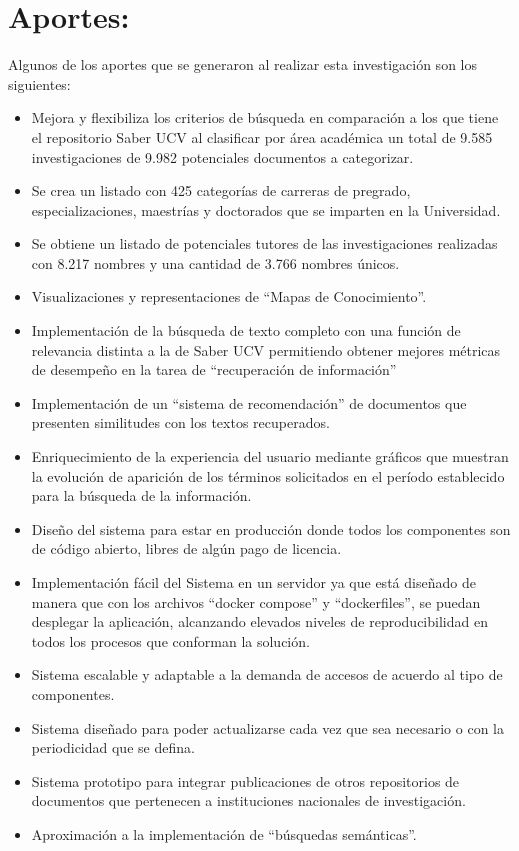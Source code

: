 \documentclass[
  12pt,
  openany]{book}
\begin{document}
\hypertarget{aporte}{%
\section{Aportes:}\label{aporte}}

Algunos de los aportes que se generaron al realizar esta investigación son los siguientes:

\begin{itemize}
\item
  Mejora y flexibiliza los criterios de búsqueda en comparación a los que tiene el repositorio Saber UCV al clasificar por área académica un total de 9.585 investigaciones de 9.982 potenciales documentos a categorizar.
\item
  Se crea un listado con 425 categorías de carreras de pregrado, especializaciones, maestrías y doctorados que se imparten en la Universidad.
\item
  Se obtiene un listado de potenciales tutores de las investigaciones realizadas con 8.217 nombres y una cantidad de 3.766 nombres únicos.
\item
  Visualizaciones y representaciones de ``Mapas de Conocimiento''.
\item
  Implementación de la búsqueda de texto completo con una función de relevancia distinta a la de Saber UCV permitiendo obtener mejores métricas de desempeño en la tarea de ``recuperación de información''
\item
  Implementación de un ``sistema de recomendación'' de documentos que presenten similitudes con los textos recuperados.
\item
  Enriquecimiento de la experiencia del usuario mediante gráficos que muestran la evolución de aparición de los términos solicitados en el período establecido para la búsqueda de la información.
\item
  Diseño del sistema para estar en producción donde todos los componentes son de código abierto, libres de algún pago de licencia.
\item
  Implementación fácil del Sistema en un servidor ya que está diseñado de manera que con los archivos ``docker compose'' y ``dockerfiles'', se puedan desplegar la aplicación, alcanzando elevados niveles de reproducibilidad en todos los procesos que conforman la solución.
\item
  Sistema escalable y adaptable a la demanda de accesos de acuerdo al tipo de componentes.
\item
  Sistema diseñado para poder actualizarse cada vez que sea necesario o con la periodicidad que se defina.
\item
  Sistema prototipo para integrar publicaciones de otros repositorios de documentos que pertenecen a instituciones nacionales de investigación.
\item
  Aproximación a la implementación de ``búsquedas semánticas''.
\end{itemize}
\end{document}
